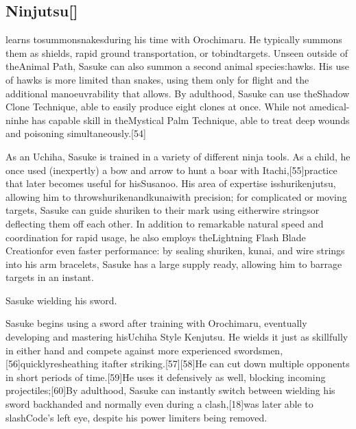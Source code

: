 \documentclass[a4paper,12pt]{article}
\begin{document}
\subsection*{Ninjutsu[]}\n\nSasuke learns tosummonsnakesduring his time with Orochimaru. He typically summons them as shields, rapid ground transportation, or tobindtargets. Unseen outside of theAnimal Path, Sasuke can also summon a second animal species:hawks. His use of hawks is more limited than snakes, using them only for flight and the additional manoeuvrability that allows. By adulthood, Sasuke can use theShadow Clone Technique, able to easily produce eight clones at once. While not amedical-ninhe has capable skill in theMystical Palm Technique, able to treat deep wounds and poisoning simultaneously.[54]\\ \par \vspace{0.5cm}

As an Uchiha, Sasuke is trained in a variety of different ninja tools. As a child, he once used (inexpertly) a bow and arrow to hunt a boar with Itachi,[55]practice that later becomes useful for hisSusanoo. His area of expertise isshurikenjutsu, allowing him to throwshurikenandkunaiwith precision; for complicated or moving targets, Sasuke can guide shuriken to their mark using eitherwire stringsor deflecting them off each other. In addition to remarkable natural speed and coordination for rapid usage, he also employs theLightning Flash Blade Creationfor even faster performance: by sealing shuriken, kunai, and wire strings into his arm bracelets, Sasuke has a large supply ready, allowing him to barrage targets in an instant.\\ \par \vspace{0.5cm}

Sasuke wielding his sword.\\ \par \vspace{0.5cm}

Sasuke begins using a sword after training with Orochimaru, eventually developing and mastering hisUchiha Style Kenjutsu. He wields it just as skillfully in either hand and compete against more experienced swordsmen,[56]quicklyresheathing itafter striking.[57][58]He can cut down multiple opponents in short periods of time.[59]He uses it defensively as well, blocking incoming projectiles;[60]By adulthood, Sasuke can instantly switch between wielding his sword backhanded and normally even during a clash,[18]was later able to slashCode's left eye, despite his power limiters being removed.\\ \par \vspace{0.5cm}
\end{document}

